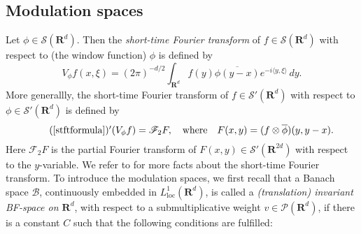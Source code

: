 \documentclass[12pt,a4paper,reqno]{amsart}
\numberwithin{equation}{section}
\numberwithin{thm}{section}
\theoremstyle{definition}
\theoremstyle{remark}
\begin{document}
\par
\subsection{Modulation spaces}\label{subs:1.2}
Let $\phi \in \mathscr S({\mathbf R^{d}})$. Then the \emph{short-time Fourier transform} of $f\in \mathscr
S({\mathbf R^{d}})$ with respect to (the window function) $\phi$ is defined by
\begin{equation}\label{stftformula}
V_\phi f(x,\xi ) = (2\pi )^{-d/2}\int _{{\mathbf R^{{d}}}} f(y)\overline {\phi
(y-x)}e^{-i{\langle y,\xi\rangle}}\, dy.
\end{equation}
More generallly, the short-time Fourier transform of $f \in \mathscr S'({\mathbf R^{d}})$ with
respect to $\phi  \in \mathscr S'({\mathbf R^{d}})$ is defined by
\begin{equation}\tag*{(\ref{stftformula})$'$}
(V_\phi f) =\mathscr F_2F,\quad \text{where}\quad F(x,y)=(f\otimes
\overline \phi)(y,y-x).
\end{equation}
Here $\mathscr F_2F$ is the partial Fourier transform of
$F(x,y)\in \mathscr S'({\mathbf R^{{2d}}})$ with respect to the $y$-variable.
We refer to \cite{Fo, Gro-book} for more facts about the short-time Fourier
transform.
To introduce the modulation spaces, we first recall that a Banach space $\mathscr B$,
continuously embedded in $L^1_{\mathrm{loc}}({\mathbf R^{d}})$,
is called a \emph{(translation) invariant
BF-space on ${\mathbf R^{d}}$}, with respect to a submultiplicative weight
$v \in \mathscr P({\mathbf R^{{d}}})$, if there is a constant $C$
such that the following conditions are fulfilled:
\end{document}
